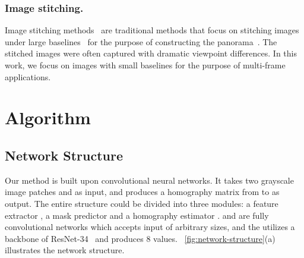 \documentclass[runningheads]{llncs}
\begin{document}
\begin{figure*}[t!]
  \centering
  \hfill
\caption{The overall structure of our deep homography estimation network (a) and the triplet loss we design to train the network (b). In (a), two input patches  and  are fed into two branches consisting of feature extractor  and mask predictor  respectively, generating features  and masks . Then the features and masks are fed into a homography estimator to produce 8 values of the homography matrix . In , convolution blocks in various colors differ in the number of channels (detailed in Table~\ref{tab:net-layers}). To train the network in (a), we design a triplet loss composed of  as defined in Eq.~\ref{eq:l1-warp-Ia-Ib},~\ref{eq:l1-Ia-Ib} and~\ref{eq:tripleloss}.
  }\label{fig:network-structure}\end{figure*}
\subsubsection{Image stitching.}
Image stitching methods~\cite{zaragoza2013projective,lin2017direct} are traditional methods that focus on stitching images under large baselines~\cite{zhang2014parallax} for the purpose of constructing the panorama~\cite{brown2003recognising}. The stitched images were often captured with dramatic viewpoint differences. In this work, we focus on images with small baselines for the purpose of multi-frame applications. 



\section{Algorithm}\label{sec:algo}

\subsection{Network Structure}Our method is built upon convolutional neural networks. It takes two grayscale image patches  and  as input, and produces a homography matrix  from  to  as output. The entire structure could be divided into three modules: a feature extractor , a mask predictor  and a homography estimator .  and  are fully convolutional networks which accepts input of arbitrary sizes, and the  utilizes a backbone of ResNet-34~\cite{he2016deep} and produces 8 values. \figurename~\ref{fig:network-structure}(a) illustrates the network structure. 
\end{document}

